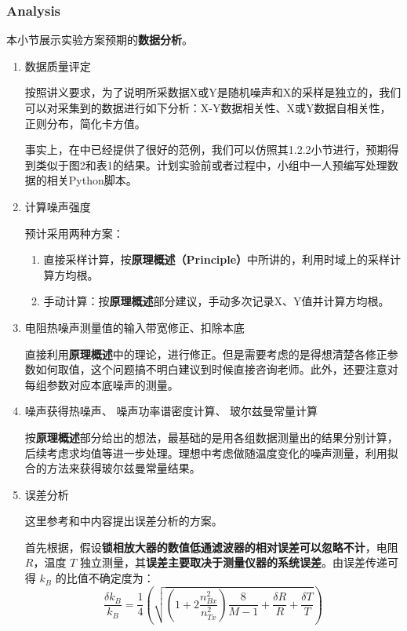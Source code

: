 \subsubsection{Analysis}
本小节展示实验方案预期的\textbf{数据分析}。
\begin{enumerate}
	\item 数据质量评定
	
	按照讲义要求，为了说明所采数据X或Y是随机噪声和X的采样是独立的，我们可以对采集到的数据进行如下分析：X-Y数据相关性、X或Y数据自相关性，正则分布，简化卡方值。
	
	事实上，在\cite{c}中已经提供了很好的范例，我们可以仿照其1.2.2小节进行，预期得到类似于图2和表1的结果。计划实验前或者过程中，小组中一人预编写处理数据的相关Python脚本。
	
	\item 计算噪声强度
	
	预计采用两种方案：
	\begin{enumerate}
		\item 直接采样计算，按\textbf{原理概述（Principle）}中所讲的，利用时域上的采样计算方均根。
		\item 手动计算：按\textbf{原理概述}部分建议，手动多次记录X、Y值并计算方均根。
	\end{enumerate}
	
	\item 电阻热噪声测量值的输入带宽修正、扣除本底
	
	直接利用\textbf{原理概述}中的理论，进行修正。但是需要考虑的是得想清楚各修正参数如何取值，这个问题搞不明白建议到时候直接咨询老师。此外，还要注意对每组参数对应本底噪声的测量。
	
	\item 噪声获得热噪声、 噪声功率谱密度计算、 玻尔兹曼常量计算
	
	按\textbf{原理概述}部分给出的想法，最基础的是用各组数据测量出的结果分别计算，后续考虑求均值等进一步处理。理想中考虑做随温度变化的噪声测量，利用拟合的方法来获得玻尔兹曼常量结果。
	
	\item 误差分析
	
	这里参考\cite{g}和\cite{c}中内容提出误差分析的方案。
	
	首先根据\cite{g}，假设\textbf{锁相放大器的数值低通滤波器的相对误差可以忽略不计}，电阻 $R$，温度 $T$ 独立测量，其\textbf{误差主要取决于测量仪器的系统误差}。由误差传递可得 $k_B$ 的比值不确定度为：
	\[
	\frac{\delta k_B}{k_B} = \frac{1}{4} \left(\sqrt{\left( 1 + 2 \frac{n_{Bx}^2}{n_{Tx}^2} \right) \frac{8}{M - 1} + \frac{\delta R}{R} + \frac{\delta T}{T}}\right)
	\]
	

\end{enumerate}
